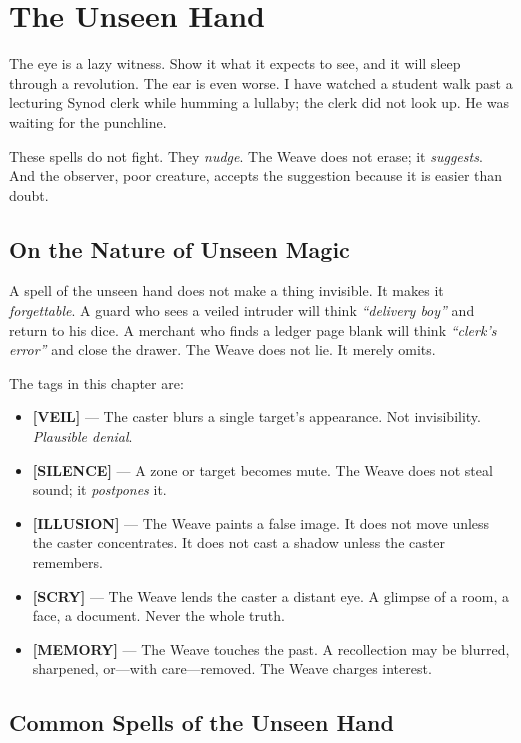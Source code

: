 \section{The Unseen Hand}

The eye is a lazy witness. Show it what it expects to see, and it will sleep through a revolution. The ear is even worse. I have watched a student walk past a lecturing Synod clerk while humming a lullaby; the clerk did not look up. He was waiting for the punchline.

These spells do not fight. They \emph{nudge}. The Weave does not erase; it \emph{suggests}. And the observer, poor creature, accepts the suggestion because it is easier than doubt.

\subsection{On the Nature of Unseen Magic}

A spell of the unseen hand does not make a thing invisible. It makes it \emph{forgettable}. A guard who sees a veiled intruder will think \emph{``delivery boy''} and return to his dice. A merchant who finds a ledger page blank will think \emph{``clerk's error''} and close the drawer. The Weave does not lie. It merely omits.

The tags in this chapter are:

\begin{itemize}
    \item \textbf{[VEIL]} --- The caster blurs a single target's appearance. Not invisibility. \emph{Plausible denial}.
    \item \textbf{[SILENCE]} --- A zone or target becomes mute. The Weave does not steal sound; it \emph{postpones} it.
    \item \textbf{[ILLUSION]} --- The Weave paints a false image. It does not move unless the caster concentrates. It does not cast a shadow unless the caster remembers.
    \item \textbf{[SCRY]} --- The Weave lends the caster a distant eye. A glimpse of a room, a face, a document. Never the whole truth.
    \item \textbf{[MEMORY]} --- The Weave touches the past. A recollection may be blurred, sharpened, or---with care---removed. The Weave charges interest.
\end{itemize}

\subsection{Common Spells of the Unseen Hand}


